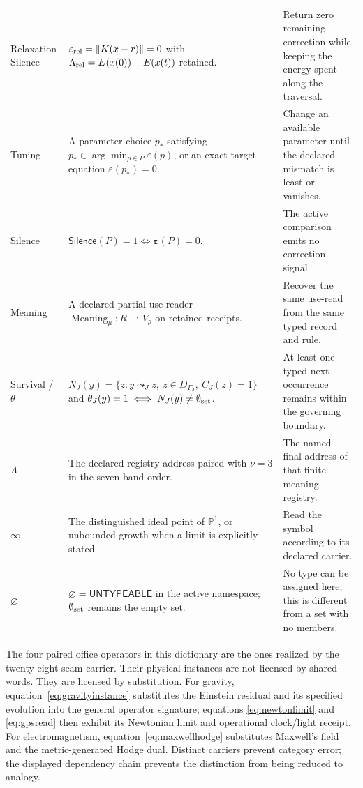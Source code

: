 \documentclass[10pt]{article}
\begin{document}
\begin{longtable}{@{}p{}p{}p{}@{}}
Relaxation Silence & $\varepsilon_{\rm rel}=\|K(x-r)\|=0$ with $\Lambda_{\rm rel}=E(x(0))-E(x(t))$ retained. & Return zero remaining correction while keeping the energy spent along the traversal.\\
Tuning & A parameter choice $p_*$ satisfying $p_*\in\arg\min_{p\in P}\varepsilon(p)$, or an exact target equation $\varepsilon(p_*)=0$. & Change an available parameter until the declared mismatch is least or vanishes.\\
Silence & $\mathsf{Silence}(P)=1\iff\boldsymbol\varepsilon(P)=0$. & The active comparison emits no correction signal.\\
Meaning & A declared partial use-reader $\operatorname{Meaning}_\mu:R\rightharpoonup V_\rho$ on retained receipts. & Recover the same use-read from the same typed record and rule.\\
Survival / $\theta$ & $N_J(y)=\{z:y\leadsto_J z,\ z\in D_{\Gamma_J},\ C_J(z)=1\}$ and $\theta_J(y)=1\iff N_J(y)\ne\emptyset_{\rm set}$. & At least one typed next occurrence remains within the governing boundary.\\
$\Lambda$ & The declared registry address paired with $\nu=3$ in the seven-band order. & The named final address of that finite meaning registry.\\
$\infty$ & The distinguished ideal point of $\mathbb P^1$, or unbounded growth when a limit is explicitly stated. & Read the symbol according to its declared carrier.\\
$\varnothing$ & $\varnothing=\mathsf{UNTYPEABLE}$ in the active namespace; $\emptyset_{\rm set}$ remains the empty set. & No type can be assigned here; this is different from a set with no members.\\
\bottomrule
\end{longtable}
\normalsize
The four paired office operators in this dictionary are the ones realized by
the twenty-eight-seam carrier. Their physical instances are not licensed by
shared words. They are licensed by substitution. For gravity,
equation~\eqref{eq:gravityinstance} substitutes the Einstein residual and its
specified evolution into the general operator signature; equations
\eqref{eq:newtonlimit} and \eqref{eq:gpsread} then exhibit its Newtonian limit
and operational clock/light receipt. For electromagnetism,
equation~\eqref{eq:maxwellhodge} substitutes Maxwell's field and the
metric-generated Hodge dual. Distinct carriers prevent category error; the
displayed dependency chain prevents the distinction from being reduced to
analogy.
\end{document}

